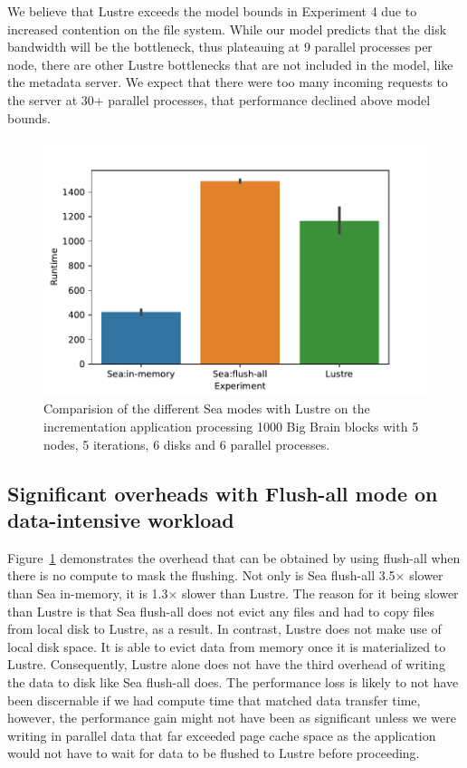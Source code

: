       We believe that Lustre exceeds the model bounds in Experiment 4 due to
      increased contention on the file system. While our model predicts that the
      disk bandwidth will be the bottleneck, thus plateauing at 9 parallel
      processes per node, there are other Lustre bottlenecks that are not
      included in the model, like the metadata server. We expect that there were
      too many incoming requests to the server at 30+ parallel processes, that
      performance declined above model bounds. 
      

    \begin{figure}

        \centering
        \includegraphics[width=\columnwidth]{figures/sea-comp/flushall.pdf}%
        \caption{Comparision of the different Sea modes with Lustre on the incrementation application
        processing 1000 Big Brain blocks with 5 nodes, 5 iterations, 6 disks and 6 parallel processes.}
    \label{fig:sea-comp:flush}
    \end{figure}

      \subsection{Significant overheads with Flush-all mode on data-intensive workload}

      Figure~\ref{fig:sea-comp:flush} demonstrates the overhead that can be
      obtained by using flush-all when there is no compute to mask the flushing.
      Not only is Sea flush-all 3.5$\times$ slower than Sea in-memory, it is
      1.3$\times$ slower than Lustre. The reason for it being slower than Lustre
      is that Sea flush-all does not evict any files and had to copy files from
      local disk to Lustre, as a result. In contrast, Lustre does not make use
      of local disk space. It is able to evict data from memory once it is
      materialized to Lustre. Consequently, Lustre alone does not have the third
      overhead of writing the data to disk like Sea flush-all does. The
      performance loss is likely to not have been discernable if we had compute
      time that matched data transfer time, however, the performance gain might
      not have been as significant unless we were writing in parallel data that
      far exceeded page cache space as the application would not have to wait
      for data to be flushed to Lustre before proceeding.

